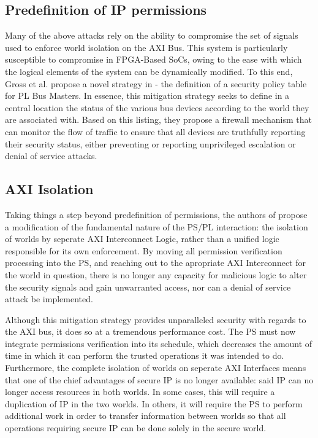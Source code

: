 \documentclass[journal]{IEEEtran}
\begin{document}
\subsection{Predefinition of IP permissions}
Many of the above attacks rely on the ability to compromise the set of signals used to
enforce world isolation on the AXI Bus. This system is particularly susceptible to
compromise in FPGA-Based SoCs, owing to the ease with which the logical elements of the
system can be dynamically modified. To this end, Gross et al. propose a novel strategy in
\cite{gross_breaking_2019} - the definition of a security policy table for PL Bus Masters.
In essence, this mitigation strategy seeks to define in a central location the status of
the various bus devices according to the world they are associated with. Based on this
listing, they propose a firewall mechanism that can monitor the flow of traffic to ensure
that all devices are truthfully reporting their security status, either preventing or 
reporting unprivileged escalation or denial of service attacks.

\subsection{AXI Isolation}
Taking things a step beyond predefinition of permissions, the authors of 
\cite{benhani_security_2017} propose a modification of the fundamental nature of the PS/PL
interaction: the isolation of worlds by seperate AXI Interconnect Logic, rather than a 
unified logic responsible for its own enforcement. By moving all permission verification
processing into the PS, and reaching out to the apropriate AXI Interconnect for the world
in question, there is no longer any capacity for malicious logic to alter the security
signals and gain unwarranted access, nor can a denial of service attack be implemented.

Although this mitigation strategy provides unparalleled security with regards to the AXI
bus, it does so at a tremendous performance cost. The PS must now integrate permissions 
verification into its schedule, which decreases the amount of time in which it can perform
the trusted operations it was intended to do. Furthermore, the complete isolation of
worlds on seperate AXI Interfaces means that one of the chief advantages of secure IP is
no longer available: said IP can no longer access resources in both worlds. In some cases,
this will require a duplication of IP in the two worlds. In others, it will require the PS
to perform additional work in order to transfer information between worlds so that all
operations requiring secure IP can be done solely in the secure world.
\end{document}
